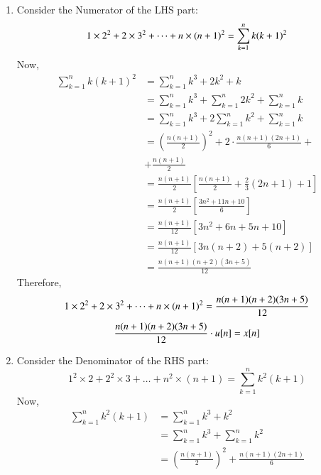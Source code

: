 \documentclass[journal,12pt,twocolumn]{IEEEtran}
\theoremstyle{remark}
\begin{document}
\begin{enumerate}[label=\alph*)]
\item Consider the Numerator of the LHS part:
\begin{equation}
    1\times2^2 + 2\times3^2 + \dots + n\times(n+1)^2 = \sum_{k=1}^n k(k+1)^2 \notag
\end{equation}
Now,
\begin{align*}
    \sum_{k=1}^n k(k+1)^2 &= \sum_{k=1}^n k^3+2k^2+k\\
                          &=  \sum_{k=1}^n k^3 + \sum_{k=1}^n 2k^2 + \sum_{k=1}^n k\\
                          &=  \sum_{k=1}^n k^3 + 2\sum_{k=1}^n k^2 + \sum_{k=1}^n k\\
                          &= \left(\frac{n(n+1)}{2}\right)^{\scriptstyle 2} + 2\cdot \frac{n(n+1)(2n+1)}{6}+\\  &+\frac{n(n+1)}{2}\\
                          &= \frac{n(n+1)}{2}\left[\frac{n(n+1)}{2} + \frac{2}{3}(2n+1) + 1\right]\\
                          &= \frac{n(n+1)}{2}\left[\frac{3n^2 + 11n +10}{6}\right]\\
                          &= \frac{n(n+1)}{12}\left[3n^2 + 6n + 5n + 10\right]\\
                          &= \frac{n(n+1)}{12}\left[3n(n+2)+5(n+2)\right]\\
                          &= \frac{n(n+1)(n+2)(3n+5)}{12}
\end{align*}
Therefore,
\begin{equation}
   1\times2^2 + 2\times3^2 + \dots + n\times(n+1)^2 = \frac{n(n+1)(n+2)(3n+5)}{12}  \notag \\
\end{equation}
\begin{align*}
    \frac{n(n+1)(n+2)(3n+5)}{12}\cdot u[n] = x[n]\notag 
\end{align*}
\item Consider the Denominator of the RHS part:
\begin{equation*}
    1^2\times2 + 2^2\times3 +\dots + n^2\times(n+1) = \sum_{k=1}^n k^2(k+1)
\end{equation*}
Now,\\
\begin{align*}
     \sum_{k=1}^n k^2(k+1) &= \sum_{k=1}^n k^3+k^2\\
                           &=  \sum_{k=1}^n k^3 + \sum_{k=1}^n k^2\\
                           &=  \left(\frac{n(n+1)}{2}\right)^{\scriptstyle 2}+\frac{n(n+1)(2n+1)}{6}\\ 

\end{align*}
\end{enumerate}
\end{document}
